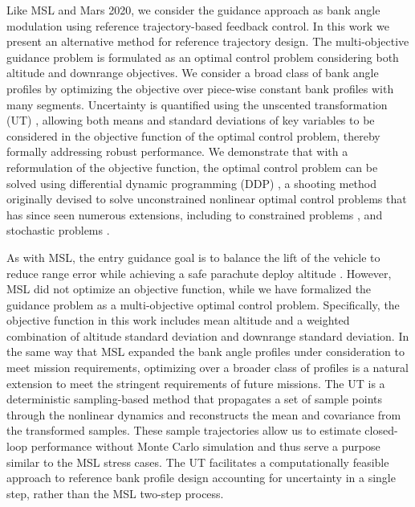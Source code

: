 \documentclass[journal ]{new-aiaa}
\begin{document}
Like MSL and Mars 2020, we consider the guidance approach as bank angle modulation using reference trajectory-based feedback control. In this work we present an alternative method for reference trajectory design. The multi-objective guidance problem is formulated as an optimal control problem considering both altitude and downrange objectives. 
We consider a broad class of bank angle profiles by optimizing the objective over piece-wise constant bank profiles with many segments.
Uncertainty is quantified using the unscented transformation (UT) \cite{UT1997}, allowing both means and standard deviations of key variables to be considered in the objective function of the optimal control problem, thereby formally addressing robust performance. We demonstrate that with a reformulation of the objective function, the optimal control problem can be solved using differential dynamic programming (DDP) \cite{DDP}, a shooting method originally devised to solve unconstrained nonlinear optimal control problems that has since seen numerous extensions, including to constrained problems \cite{DDP_ControlLimited,HDDP1,HDDP2,DDP_NonlinearConstraints,DDP_InteriorPoint}, and stochastic problems \cite{iLQG, DDP_Stochastic, ozaki_UT,ozaki2020tube}. 

As with MSL, the entry guidance goal is to balance the lift of the vehicle to reduce range error while achieving a safe parachute deploy altitude \cite{MSL_EDL2}. 
However, MSL did not optimize an objective function, while we have formalized the guidance problem as a multi-objective optimal control problem. Specifically, the objective function in this work includes mean altitude and a weighted combination of altitude standard deviation and downrange standard deviation. 
In the same way that MSL expanded the bank angle profiles under consideration to meet mission requirements, optimizing over a broader class of profiles is a natural extension to meet the stringent requirements of future missions. 
The UT is a deterministic sampling-based method that propagates a set of sample points through the nonlinear dynamics and reconstructs the mean and covariance from the transformed samples. These sample trajectories allow us to estimate closed-loop performance without Monte Carlo simulation and thus serve a purpose similar to the MSL stress cases. The UT facilitates a computationally feasible approach to reference bank profile design accounting for uncertainty in a single step, rather than the MSL two-step process.
\end{document}
